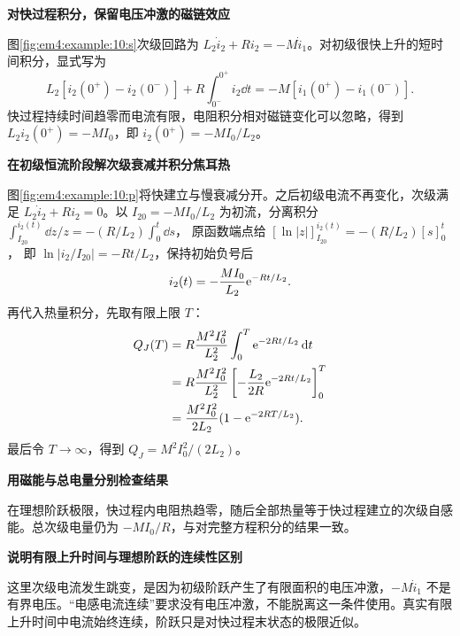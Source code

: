 \begin{solution}\textbf{对快过程积分，保留电压冲激的磁链效应}\par\nobreak
图\ref{fig:em4:example:10:s}次级回路为 $L_2\dot i_2+Ri_2=-M\dot i_1$。对初级很快上升的短时间积分，显式写为
\[
L_2[i_2(0^+)-i_2(0^-)]+R\int_{0^-}^{0^+}i_2\dd t
=-M[i_1(0^+)-i_1(0^-)].
\]
快过程持续时间趋零而电流有限，电阻积分相对磁链变化可以忽略，得到 $L_2i_2(0^+)=-MI_0$，即 $i_2(0^+)=-MI_0/L_2$。



\par\medskip{}\noindent\textbf{在初级恒流阶段解次级衰减并积分焦耳热}\par\nobreak
图\ref{fig:em4:example:10:p}将快建立与慢衰减分开。之后初级电流不再变化，次级满足 $L_2\dot i_2+Ri_2=0$。以 $I_{20}=-MI_0/L_2$ 为初流，分离积分
$\int_{I_{20}}^{i_2(t)}\dd z/z=-(R/L_2)\int_0^t\dd s$，
原函数端点给 $[\ln|z|]_{I_{20}}^{i_2(t)}=-(R/L_2)[s]_0^t$，
即 $\ln|i_2/I_{20}|=-Rt/L_2$，保持初始负号后
\[
 i_2(t)=-\frac{MI_0}{L_2}\mathrm e^{-Rt/L_2}.
\]
再代入热量积分，先取有限上限 $T$：
\[
 \begin{aligned}
 Q_J(T)&=R\frac{M^2I_0^2}{L_2^2}\int_0^T\mathrm e^{-2Rt/L_2}\mathop{}\!\mathrm d t\\
 &=R\frac{M^2I_0^2}{L_2^2}
   \left[-\frac{L_2}{2R}\mathrm e^{-2Rt/L_2}\right]_0^T\\
 &=\frac{M^2I_0^2}{2L_2}(1-\mathrm e^{-2RT/L_2}).
 \end{aligned}
\]
最后令 $T\to\infty$，得到 $Q_J=M^2I_0^2/(2L_2)$。


\par\medskip{}\noindent\textbf{用磁能与总电量分别检查结果}\par\nobreak
在理想阶跃极限，快过程内电阻热趋零，随后全部热量等于快过程建立的次级自感能。总次级电量仍为 $-MI_0/R$，与对完整方程积分的结果一致。



\par\medskip{}\noindent\textbf{说明有限上升时间与理想阶跃的连续性区别}\par\nobreak
这里次级电流发生跳变，是因为初级阶跃产生了有限面积的电压冲激，$-M\dot i_1$ 不是有界电压。“电感电流连续”要求没有电压冲激，不能脱离这一条件使用。真实有限上升时间中电流始终连续，阶跃只是对快过程末状态的极限近似。\end{solution}
